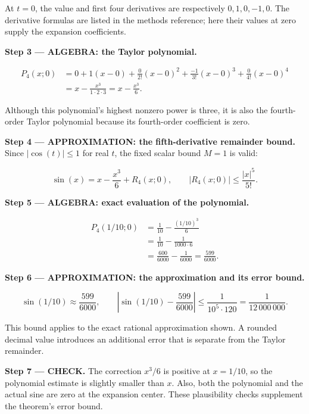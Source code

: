 \documentclass[11pt,oneside,openany]{book}
\begin{document}
At \(t=0\), the value and first four derivatives are respectively \(0,1,0,-1,0\).
The derivative formulas are listed in the methods reference; here their values
at zero supply the expansion coefficients.

\begingroup\color{TrickPurple}
\textbf{Step 3 --- ALGEBRA: the Taylor polynomial.}

\[
\begin{aligned}
P_4(x;0)
&=0+1(x-0)+\frac0{2!}(x-0)^2
+\frac{-1}{3!}(x-0)^3+\frac0{4!}(x-0)^4\\
&=x-\frac{x^3}{1\cdot2\cdot3}
=x-\frac{x^3}{6}.
\end{aligned}
\]

Although this polynomial's highest nonzero power is three, it is also the
fourth-order Taylor polynomial because its fourth-order coefficient is zero.

\endgroup
\begingroup\color{TrickPurple}
\textbf{Step 4 --- APPROXIMATION: the fifth-derivative remainder bound.} Since
\(|\cos(t)|\leq1\) for real \(t\), the fixed scalar bound \(M=1\) is valid:

\[
\sin(x)=x-\frac{x^3}{6}+R_4(x;0),
\qquad |R_4(x;0)|\leq\frac{|x|^5}{5!}.
\]

\endgroup
\begingroup\color{TrickPurple}
\textbf{Step 5 --- ALGEBRA: exact evaluation of the polynomial.}

\[
\begin{aligned}
P_4(1/10;0)
&=\frac1{10}-\frac{(1/10)^3}{6}\\
&=\frac1{10}-\frac1{1000\cdot6}\\
&=\frac{600}{6000}-\frac1{6000}
=\frac{599}{6000}.
\end{aligned}
\]

\endgroup
\begingroup\color{TrickPurple}
\textbf{Step 6 --- APPROXIMATION: the approximation and its error bound.}

\[
\sin(1/10)\approx\frac{599}{6000},
\qquad
\left|\sin(1/10)-\frac{599}{6000}\right|
\leq\frac1{10^5\cdot120}
=\frac1{12\,000\,000}.
\]

This bound applies to the exact rational approximation shown. A rounded decimal
value introduces an additional error that is separate from the Taylor remainder.

\endgroup
\textbf{Step 7 --- CHECK.} The correction \(x^3/6\) is positive at \(x=1/10\), so the
polynomial estimate is slightly smaller than \(x\). Also, both the polynomial and
the actual sine are zero at the expansion center. These plausibility checks
supplement the theorem's error bound.
\end{document}
